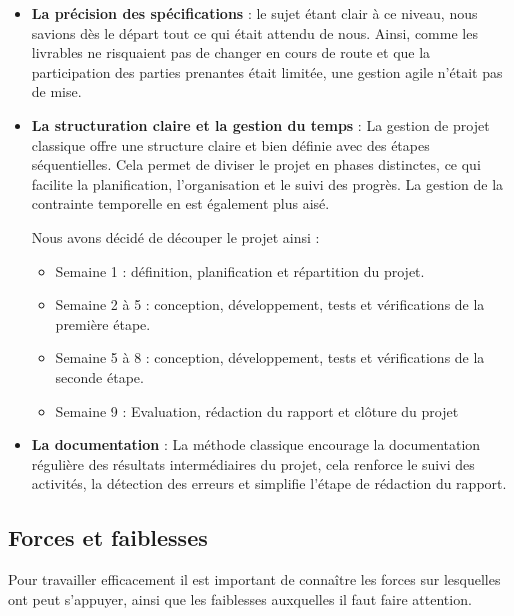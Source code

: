 \documentclass[a4paper, 12pt]{report}
\begin{document}
\begin{itemize}
    \item \textbf{La précision des spécifications} : le sujet étant clair à ce niveau, nous savions dès le départ tout ce qui était attendu de nous. Ainsi, comme les livrables ne risquaient pas de changer en cours de route et que la participation des parties prenantes était limitée, une gestion agile n'était pas de mise.
    \bigskip
    
    \item \textbf{La structuration claire et la gestion du temps} : La gestion de projet classique offre une structure claire et bien définie avec des étapes séquentielles. Cela permet de diviser le projet en phases distinctes, ce qui facilite la planification, l'organisation et le suivi des progrès. La gestion de la contrainte temporelle en est également plus aisé.
    \bigskip
    
    Nous avons décidé de découper le projet ainsi :
    \begin{itemize}
        \item Semaine 1 : définition, planification et répartition du projet.
        \item Semaine 2 à 5 : conception, développement, tests et vérifications de la première étape.
        \item Semaine 5 à 8 : conception, développement, tests et vérifications de la seconde étape.
        \item Semaine 9 : Evaluation, rédaction du rapport et clôture du projet
    \end{itemize}
    \bigskip

    \item \textbf{La documentation} : La méthode classique encourage la documentation régulière des résultats intermédiaires du projet, cela renforce le suivi des activités, la détection des erreurs et simplifie l'étape de rédaction du rapport.
\end{itemize}

        \subsection{Forces et faiblesses}

Pour travailler efficacement il est important de connaître les forces sur lesquelles ont peut s'appuyer, ainsi que les faiblesses auxquelles il faut faire attention.
\bigskip
\end{document}
